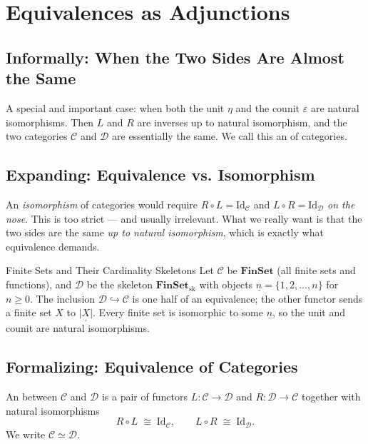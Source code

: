 \section{Equivalences as Adjunctions}
\label{sec:equivalences}

\subsection{Informally: When the Two Sides Are Almost the Same}

A special and important case: when both the unit $\eta$ and the counit
$\varepsilon$ are natural isomorphisms. Then $L$ and $R$ are inverses up
to natural isomorphism, and the two categories $\mathcal{C}$ and
$\mathcal{D}$ are essentially the same. We call this an
 of categories.

\subsection{Expanding: Equivalence vs. Isomorphism}

An \emph{isomorphism} of categories would require $R \circ L = \mathrm{Id}_\mathcal{C}$
and $L \circ R = \mathrm{Id}_\mathcal{D}$ \emph{on the nose}. This is too
strict --- and usually irrelevant. What we really want is that the two
sides are the same \emph{up to natural isomorphism}, which is exactly
what equivalence demands.

\begin{example}{Finite Sets and Their Cardinality Skeletons}
Let $\mathcal{C}$ be $\mathbf{FinSet}$ (all finite sets and functions),
and $\mathcal{D}$ be the skeleton $\mathbf{FinSet}_\mathrm{sk}$ with
objects $\underline{n} = \{1, 2, \ldots, n\}$ for $n \geq 0$. The
inclusion $\mathcal{D} \hookrightarrow \mathcal{C}$ is one half of an
equivalence; the other functor sends a finite set $X$ to
$\underline{|X|}$. Every finite set is isomorphic to some $\underline{n}$,
so the unit and counit are natural isomorphisms.
\end{example}

\subsection{Formalizing: Equivalence of Categories}

An  between $\mathcal{C}$ and $\mathcal{D}$
is a pair of functors $L : \mathcal{C} \to \mathcal{D}$ and
$R : \mathcal{D} \to \mathcal{C}$ together with natural isomorphisms
\begin{equation*}
  R \circ L \;\cong\; \mathrm{Id}_\mathcal{C},
  \qquad
  L \circ R \;\cong\; \mathrm{Id}_\mathcal{D}.
\end{equation*}
We write $\mathcal{C} \simeq \mathcal{D}$.

